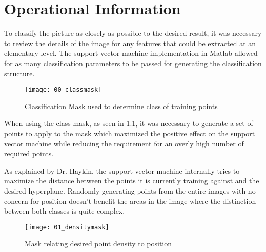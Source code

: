 \chapter{Operational Information}

To classify the picture as closely as possible to the desired result, it was necessary to review the details of the image for any features that could be extracted at an elementary level. The support vector machine implementation in Matlab allowed for as many classification parameters to be passed for generating the classification structure.


\begin{figure}[h]
    \centering
    \texttt{[image: 00\_classmask]}
    \caption{Classification Mask used to determine class of training points}
    \label{fig:00_classmask}
\end{figure}

When using the class mask, as seen in \ref{fig:00_classmask}, it was necessary to generate a set of points to apply to the mask which maximized the positive effect on the support vector machine while reducing the requirement for an overly high number of required points. 

As explained by Dr. Haykin, the support vector machine internally tries to maximize the distance between the points it is currently training against and the desired hyperplane. \citep{00_SimonHaykin} Randomly generating points from the entire images with no concern for position doesn't benefit the areas in the image where the distinction between both classes is quite complex.

\begin{figure}[h]
    \centering
    \texttt{[image: 01\_densitymask]}
    \caption{Mask relating desired point density to position}
    \label{fig:01_densitymask}
\end{figure}


